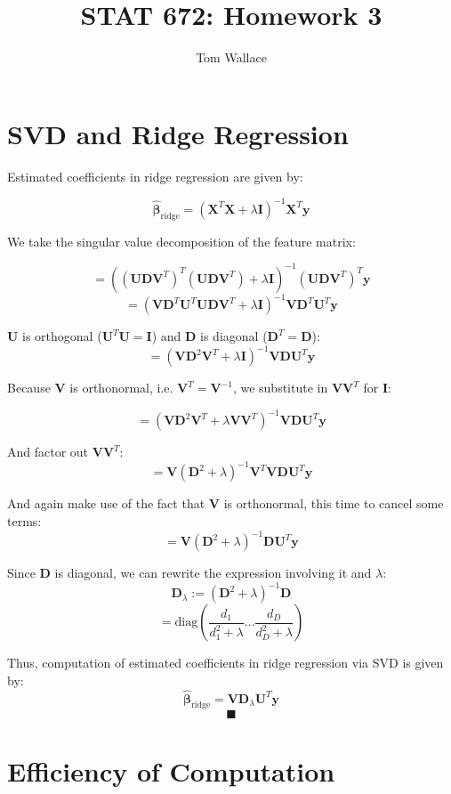 \documentclass{article}
\title{STAT 672: Homework 3}
\author{Tom Wallace}
\begin{document}
\maketitle

\section*{SVD and Ridge Regression}

Estimated coefficients in ridge regression are given by:

$$
\hat{\bm{\beta}}_{\mathrm{ridge}} = (\mathbf{X}^T\mathbf{X} + \lambda
\mathbf{I})^{-1}\mathbf{X}^T\mathbf{y}
$$

We take the singular value decomposition of the feature matrix:

$$
= ((\mathbf{UDV}^T)^T(\mathbf{UDV}^T)+\lambda \mathbf{I})^{-1} (\mathbf{UDV}^T)^T \mathbf{y}
$$
$$
= (\mathbf{VD}^T\mathbf{U}^T\mathbf{UDV}^T + \lambda \mathbf{I})^{-1}
\mathbf{VD}^T\mathbf{U}^T \mathbf{y}
$$

$\mathbf{U}$ is orthogonal ($\mathbf{U}^T\mathbf{U}=\mathbf{I}$) and
$\mathbf{D}$ is diagonal ($\mathbf{D}^T = \mathbf{D}$):
$$
= (\mathbf{VD}^2\mathbf{V}^T + \lambda \mathbf{I})^{-1} \mathbf{VDU}^T\mathbf{y}
$$

Because $\mathbf{V}$ is orthonormal, i.e. $\mathbf{V}^T = \mathbf{V}^{-1}$, we substitute in $\mathbf{VV}^T$ for $\mathbf{I}$:

$$
= (\mathbf{VD}^2\mathbf{V}^T + \lambda \mathbf{VV}^T)^{-1} \mathbf{VDU}^T\mathbf{y}
$$

And factor out $\mathbf{VV}^T$:
$$
= \mathbf{V}(\mathbf{D}^2 + \lambda)^{-1}\mathbf{V}^T \mathbf{VDU}^T\mathbf{y}
$$

And again make use of the fact that $\mathbf{V}$ is orthonormal, this time to
cancel some terms:
$$
= \mathbf{V}(\mathbf{D}^2 + \lambda)^{-1}\mathbf{DU}^T\mathbf{y}
$$

Since $\mathbf{D}$ is diagonal, we can rewrite the expression involving it and
$\lambda$:
$$
\mathbf{D}_\lambda := (\mathbf{D}^2 + \lambda)^{-1}\mathbf{D}
$$
$$
= \mathrm{diag}\left(\frac{d_1}{d_1^2 + \lambda} \ldots \frac{d_D}{d_D^2 +
\lambda} \right)
$$

Thus, computation of estimated coefficients in ridge regression via SVD is
given by:
$$
\hat{\bm{\beta}}_{\mathrm{ridge}} = \mathbf{VD}_\lambda \mathbf{U}^T\mathbf{y}
$$
$$
\blacksquare
$$

\section*{Efficiency of Computation}
\end{document}
